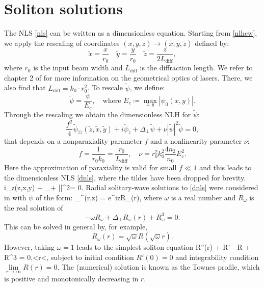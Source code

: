 \section{Soliton solutions}
The NLS \cref{nls} can be written as a dimensionless equation. Starting from 
\cref{nlhcw}, we apply the rescaling of coordinates
$(x,y,z)\to(\tilde{x},\tilde{y},\tilde{z})$ defined by:
$$ \tilde{x} = \frac{x}{r_0}\quad \tilde{y}=\frac{y}{r_0}
\quad \tilde{z} = \frac{z}{2L_\text{diff}}, $$
%
where $r_0$ is the input beam width and $L_\text{diff}$ is the diffraction
length. We refer to chapter 2 of \cite{fibg} for more information on the
geometrical optics of lasers. There, we also find that 
$L_\text{diff}=k_0\cdot r_0^2$. To rescale $\tilde\psi$, we define:
$$\tilde{\psi}=\frac{\psi}{E_c},\quad\text{where }
E_c\coloneqq\underset{x,y}{\max}\left|\psi_0(x,y)\right|.$$
%
Through the rescaling we obtain the dimensionless NLH for $\tilde\psi$:
$$\frac{f^2}{4}\tilde{\psi}_{\tilde{z}\tilde{z}}(\tilde{z},\tilde{x},\tilde{y})
+ i\tilde{\psi}_{\tilde{z}} +\Delta_\perp\tilde{\psi} 
+ \nu\left|\tilde{\psi}\right|^2\tilde{\psi}=0,$$
that depends on a nonparaxiality parameter $f$
and a nonlinearity parameter $\nu$:
$$f = \frac{1}{r_0 k_0} = \frac{r_0}{L_\text{diff}},\quad
\nu = r_0^2 k_0^2 \frac{4n_2}{n_0}E_c^2.$$
%
%
Here the approximation of paraxiality is valid for small $f\ll1$ 
and this leads to  
the dimensionless NLS \cref{dnls}, where the tildes have been dropped for brevity.
%
\be \label{dnls}
i\psi_z(z,x,y) + \Delta_\perp\psi + \nu\left|\psi\right|^2\psi = 0.
\ee
% 
Radial solitary-wave solutions to \eqref{dnls} were considered in
\cite{chia} with $\psi$ of the form: 
\be \label{psol} 
\psi_\omega^(r,z) = e^{i\omega z}R_\omega(r),
\ee
%
where $\omega$ is a real number and $R_\omega$ is the real solution of
$$ -\omega R_\omega + \Delta_\perp R_\omega(r) + R_\omega^3 = 0. $$
%
This can be solved in general by, for example,
$$ R_\omega(r) = \sqrt{\omega}R\left(\sqrt{\omega}r\right). $$
However, taking $\omega=1$ leads to the simplest soliton equation
\be \label{sol}
R''(r) +  R' - R + R^3 = 0,<r<\infty,
\ee
%
subject to initial condition $R'(0)=0$ and integrability condition
$\underset{r\to\infty}{\lim} R(r) = 0$. The (numerical) solution is known as the
Townes profile, which is positive and monotonically decreasing in $r$.


